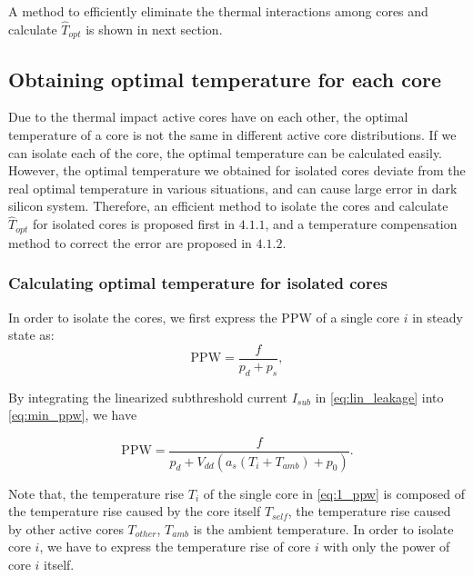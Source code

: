 A method to efficiently eliminate the thermal interactions among cores and calculate $\hat{T}_{opt}$ is shown in next section.

\subsection{Obtaining optimal temperature for each core}
Due to the thermal impact active cores have on each other, the optimal temperature of a core is not the same in different active core distributions. If we can isolate each of the core, the optimal temperature can be calculated easily. However, the optimal temperature we obtained for isolated cores deviate from the real optimal temperature in various situations, and can cause large error in dark silicon system. Therefore, an efficient method to isolate the cores and calculate $\hat{T}_{opt}$ for isolated cores is proposed first in $4.1.1$, and a temperature compensation method to correct the error are proposed in $4.1.2$.

\subsubsection{Calculating optimal temperature for isolated cores}
In order to isolate the cores, we first express the PPW of a single core $i$ in steady state as:
\begin{equation}\label{eq:min_ppw}
\text{PPW}=\frac{f}{p_{d}+p_{s}},
\end{equation}

By integrating the linearized subthreshold current $I_{sub}$ in \eqref{eq:lin_leakage} into \eqref{eq:min_ppw}, we have

\begin{equation}\label{eq:1_ppw}
\text{PPW} = \frac{f}{p_{d}+V_{dd}(a_{s}(T_{i}+T_{amb})+p_{0})}.
\end{equation}

Note that, the temperature rise $T_{i}$ of the single core in \eqref{eq:1_ppw} is composed of the temperature rise caused by the core itself $T_{self}$, the temperature rise caused by other active cores $T_{other}$, $T_{amb}$ is the ambient temperature. In order to isolate core $i$, we have to express the temperature rise of core $i$ with only the power of core $i$ itself.

